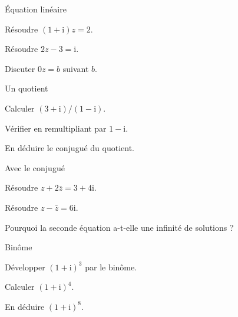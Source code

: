 \begingroup\renewcommand{\otBesoinPlace}[1]{}\begin{minipage}{\linewidth}
\begin{exercice}[2]{Équation linéaire}

\begin{questions}
\item Résoudre $(1+\mathrm i)z=2$.
\item Résoudre $2z-3=\mathrm i$.
\item Discuter $0z=b$ suivant $b$.
\end{questions}
\end{exercice}
\begin{exercice}[2]{Un quotient}

\begin{questions}
\item Calculer $(3+\mathrm i)/(1-\mathrm i)$.
\item Vérifier en remultipliant par $1-\mathrm i$.
\item En déduire le conjugué du quotient.
\end{questions}
\end{exercice}
\begin{exercice}[2]{Avec le conjugué}

\begin{questions}
\item Résoudre $z+2\bar z=3+4\mathrm i$.
\item Résoudre $z-\bar z=6\mathrm i$.
\item Pourquoi la seconde équation a-t-elle une infinité de solutions ?
\end{questions}
\end{exercice}
\begin{exercice}[2]{Binôme}

\begin{questions}
\item Développer $(1+\mathrm i)^3$ par le binôme.
\item Calculer $(1+\mathrm i)^4$.
\item En déduire $(1+\mathrm i)^8$.
\end{questions}
\end{exercice}
\end{minipage}\endgroup
\clearpage
{}
